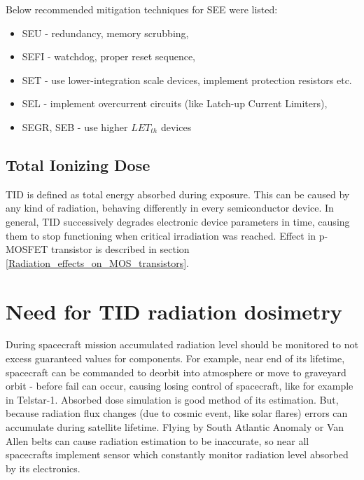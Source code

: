         Below recommended mitigation techniques for SEE were listed:
        \begin{itemize}
            \item SEU - redundancy, memory scrubbing,
            \item SEFI - watchdog, proper reset sequence,
            \item SET - use lower-integration scale devices, implement protection resistors etc.
            \item SEL - implement overcurrent circuits (like Latch-up Current Limiters),
            \item SEGR, SEB - use higher $LET_{th}$ devices
        \end{itemize}

    \subsection{Total Ionizing Dose}
        TID is defined as total energy absorbed during exposure. This can be caused by any kind of radiation, behaving differently in every semiconductor device. In general, TID successively degrades electronic device parameters in time, causing them to stop functioning when critical irradiation was reached. Effect in p-MOSFET transistor is described in section \ref{Radiation_effects_on_MOS_transistors}.

\section{Need for TID radiation dosimetry}
    During spacecraft mission accumulated radiation level should be monitored to not excess guaranteed values for components. For example, near end of its lifetime, spacecraft can be commanded to deorbit into atmosphere or move to graveyard orbit - before fail can occur, causing losing control of spacecraft, like for example in Telstar-1.
    Absorbed dose simulation is good method of its estimation. But, because radiation flux changes (due to cosmic event, like solar flares) errors can accumulate during satellite lifetime. Flying by South Atlantic Anomaly or Van Allen belts can cause radiation estimation to be inaccurate, so near all spacecrafts implement sensor which constantly monitor radiation level absorbed by its electronics.

